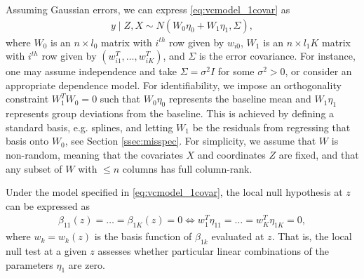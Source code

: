 Assuming Gaussian errors, we can express \eqref{eq:vcmodel_1covar} as
\begin{align}
 y \mid Z, X \sim N \left( W_0 \eta_0 + W_1 \eta_1, \Sigma \right),
\label{eq:vcmodel_1covar_matrix}
\end{align}
where $W_0$ is an $n \times l_0$ matrix with $i^{th}$ row given by $w_{i0}$, $W_1$ is an $n \times l_1 K$ matrix with $i^{th}$ row given by $(w_{i1}^T,\ldots,w_{iK}^T)$, and $\Sigma$ is the error covariance. For instance, one may assume independence and take $\Sigma = \sigma^2 I$ for some $\sigma^2 > 0$, or consider an appropriate dependence model.
For identifiability, we impose an orthogonality constraint $W_1^T W_0 = 0$ such that $W_0\eta_0$ represents the  baseline mean and $W_1\eta_1$ represents  group deviations from the baseline. This is achieved by defining a standard basis, e.g. splines, and letting $W_1$ be the residuals from regressing that basis onto $W_0$, see Section \ref{ssec:misspec}.
For simplicity, we assume that $W$ is non-random, meaning that the covariates $X$ and coordinates $Z$ are fixed, and that any subset of $W$ with $\leq n$ columns has full column-rank.

Under the model specified in \eqref{eq:vcmodel_1covar}, the local null hypothesis at $z$ can be expressed as 
\begin{align}
 \beta_{11}(z)= \ldots= \beta_{1K}(z)=0 \Longleftrightarrow 
w_1^T \eta_{11}= \ldots = w_K^T \eta_{1K}=0,
\label{eq:localnull_1covar_vcmodel}
\end{align}
where $w_k=w_k(z)$ is the basis function of $\beta_{1k}$ evaluated at $z$.
That is, the local null test at a given $z$ assesses whether particular linear combinations of the parameters $\eta_1$ are zero.

